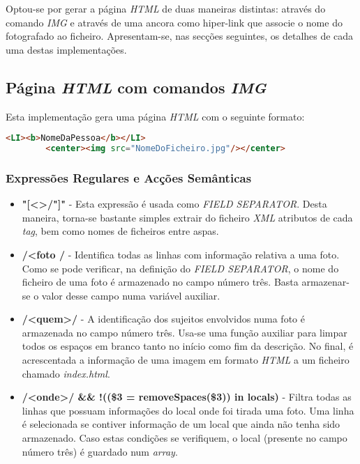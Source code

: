 \documentclass{article}
\begin{document}
Optou-se por gerar a página \emph{HTML} de duas maneiras distintas: através do comando \emph{IMG} e através de uma ancora como hiper-link que associe o nome do fotografado ao ficheiro. Apresentam-se, nas secções seguintes, os detalhes de cada uma destas implementações.


\subsection{Página \emph{HTML} com comandos \emph{IMG}}

Esta implementação gera uma página \emph{HTML} com o seguinte formato:

\begin{lstlisting}[language=html]
    <LI><b>NomeDaPessoa</b></LI>
        <center><img src="NomeDoFicheiro.jpg"/></center>
\end{lstlisting}


\subsubsection{Expressões Regulares e Acções Semânticas}

\begin{itemize}
    \item \textbf{"[\textless\textgreater/"]"} - Esta expressão é usada como \emph{FIELD SEPARATOR}. Desta maneira, torna-se bastante simples extrair do ficheiro \emph{XML} atributos de cada \emph{tag}, bem como nomes de ficheiros entre aspas. 
    \item \textbf{/\textless foto / } - Identifica todas as linhas com informação relativa a uma foto. Como se pode verificar, na definição do \emph{FIELD SEPARATOR}, o nome do ficheiro de uma foto é armazenado no campo número três. Basta armazenar-se o valor desse campo numa variável auxiliar.
    \item \textbf{/\textless quem\textgreater/} - A identificação dos sujeitos envolvidos numa foto é armazenada no campo número três. Usa-se uma função auxiliar para limpar todos os espaços em branco tanto no início como fim da descrição. No final, é acrescentada a informação de uma imagem em formato \emph{HTML} a um ficheiro chamado \emph{index.html}.
    \item \textbf{/\textless onde\textgreater/ && !((\$3 = removeSpaces(\$3)) in locals)} - Filtra todas as linhas que possuam informações do local onde foi tirada uma foto. Uma linha é selecionada se contiver informação de um local que ainda não tenha sido armazenado. Caso estas condições se verifiquem, o local (presente no campo número três) é guardado num \emph{array}. 
\end{itemize}
\end{document}
